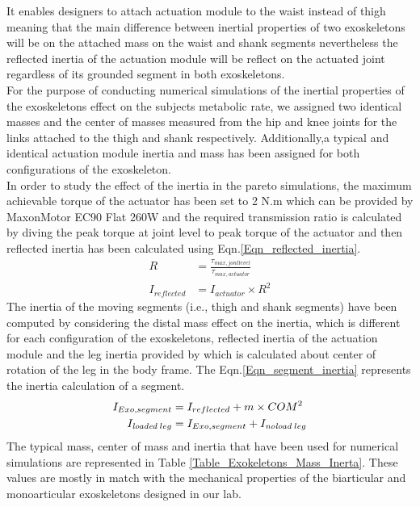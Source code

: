 \documentclass[10pt,letterpaper]{article}
\begin{document}
It enables designers to attach actuation module to the waist instead of thigh meaning that the main difference between inertial properties of two exoskeletons will be on the attached mass on the waist and shank segments nevertheless the reflected inertia of the actuation module will be reflect on the actuated joint regardless of its grounded segment in both exoskeletons.\\
For the purpose of conducting numerical simulations of the inertial properties of the exoskeletons effect on the subjects metabolic rate, we assigned two identical masses and the center of masses measured from the hip and knee joints for the links attached to the thigh and shank respectively. Additionally,a typical and identical actuation module inertia and mass has been assigned for both configurations of the exoskeleton.\\
In order to study the effect of the inertia in the pareto simulations, the maximum achievable torque of the actuator has been set to 2 N.m which can be provided by MaxonMotor EC90 Flat 260W and the required transmission ratio is calculated by diving the peak torque at joint level to peak torque of the actuator and then reflected inertia has been calculated using Eqn.\ref{Eqn_reflected_inertia}.\\
\begin{equation}\label{Eqn_reflected_inertia}
	\begin{aligned}
	R &= \frac{\tau_{max,jont level}}{\tau_{max,actuator}}\\
	I_{reflected} &= I_{actuator}\times R^{2}
	\end{aligned}
\end{equation}
The inertia of the moving segments (i.e., thigh and shank segments) have been computed by considering the distal mass effect on the inertia, which is different for each configuration of the exoskeletons, reflected inertia of the actuation module and the leg inertia provided by \cite{133} which is calculated about center of rotation of the leg in the body frame. The Eqn.\ref{Eqn_segment_inertia} represents the inertia calculation of a segment.
\begin{equation}\label{Eqn_segment_inertia}
\begin{aligned}
I_{Exo,segment} &= I_{reflected} + m\times COM^{2}\\
I_{\textit{loaded}\;leg} &= I_{Exo,segment} + I_{\textit{\textit{noload}}\;leg}
\end{aligned}
\end{equation}
The typical mass, center of mass and inertia that have been used for numerical simulations are represented in Table \ref{Table_Exokeletons_Mass_Inerta}. These values are mostly in match with the mechanical properties of the biarticular and monoarticular exoskeletons designed in our lab.\\
\end{document}
